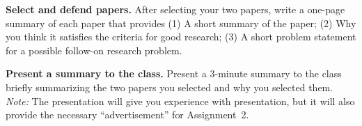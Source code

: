 \documentclass[11pt]{article}
\begin{document}
{\bf Select and defend papers.}
After selecting your two papers, write a one-page summary of each paper
that provides (1) A short summary of the paper; (2) Why you think it
satisfies the criteria for good research; (3) A short problem statement
for a possible follow-on research problem.

{\bf Present a summary to the class.}
Present a 3-minute summary to the class briefly summarizing the two
papers you selected and why you selected them.  {\em Note:} The
presentation will give you experience with presentation, but it will
also provide the necessary ``advertisement'' for Assignment~2.
\end{document}
